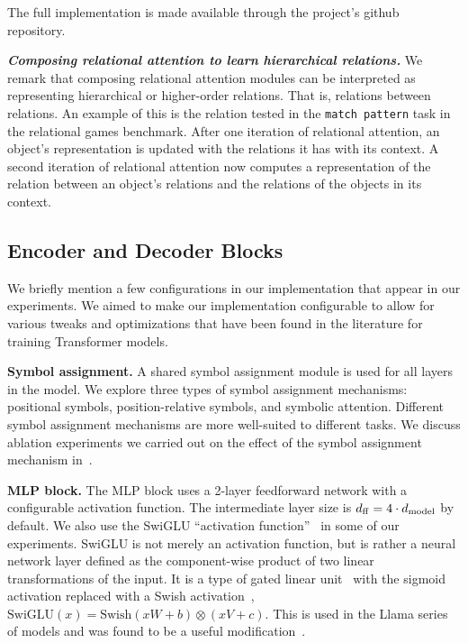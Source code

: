 The full implementation is made available through the project's github repository.


\textit{\textbf{Composing relational attention to learn hierarchical relations.}} We remark that composing relational attention modules can be interpreted as representing hierarchical or higher-order relations. That is, relations between relations. An example of this is the relation tested in the \texttt{match pattern} task in the relational games benchmark. After one iteration of relational attention, an object's representation is updated with the relations it has with its context. A second iteration of relational attention now computes a representation of the relation between an object's relations and the relations of the objects in its context.

\subsection{Encoder and Decoder Blocks}

We briefly mention a few configurations in our implementation that appear in our experiments. We aimed to make our implementation configurable to allow for various tweaks and optimizations that have been found in the literature for training Transformer models.

\textbf{Symbol assignment.} A shared symbol assignment module is used for all layers in the model. We explore three types of symbol assignment mechanisms: positional symbols, position-relative symbols, and symbolic attention. Different symbol assignment mechanisms are more well-suited to different tasks. We discuss ablation experiments we carried out on the effect of the symbol assignment mechanism in~.

\textbf{MLP block.} The MLP block uses a 2-layer feedforward network with a configurable activation function. The intermediate layer size is $d_{\mathrm{ff}} = 4 \cdot d_{\mathrm{model}}$ by default. We also use the SwiGLU ``activation function''~\citep{shazeerGLUVariantsImprove2020} in some of our experiments. SwiGLU is not merely an activation function, but is rather a neural network layer defined as the component-wise product of two linear transformations of the input. It is a type of gated linear unit~\citep{dauphin2017language} with the sigmoid activation replaced with a Swish activation~\citep{hendrycks2016gaussian}, $\mathrm{SwiGLU}(x) = \mathrm{Swish}(x W + b) \otimes (x V + c)$. This is used in the Llama series of models and was found to be a useful modification~\citep{touvronLlamaOpenFoundation2023}.

